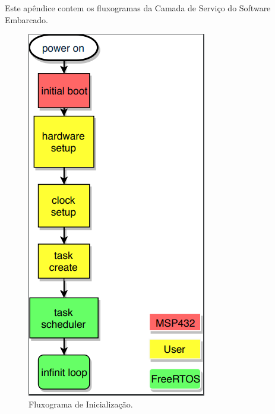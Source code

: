 \begin{apendicesenv}
Este apêndice contem os fluxogramas da Camada de Serviço do Software Embarcado.

\begin{figure}[!h]
	\centerfloat
	\centering
	\includegraphics[keepaspectratio=true,scale=0.65]{figuras/flowChart_obc.PNG}
	\caption{Fluxograma de Inicialização.}
	\label{flowChart_obc}
\end{figure}


\end{apendicesenv}
